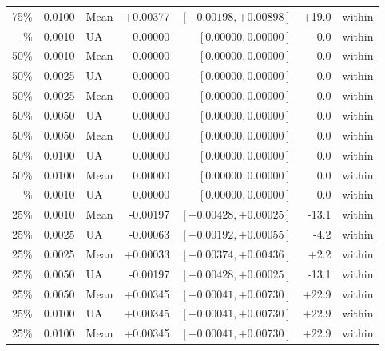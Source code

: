 \begin{table}[H]
\begin{tabular}{@{}rrlrrrl@{}}
75\% & 0.0100 & Mean & +0.00377 & $[-0.00198, +0.00898]$ & +19.0 & within \\
\addlinespace
50\% & 0.0010 & UA & 0.00000 & $[0.00000, 0.00000]$ & 0.0 & within \\
50\% & 0.0010 & Mean & 0.00000 & $[0.00000, 0.00000]$ & 0.0 & within \\
50\% & 0.0025 & UA & 0.00000 & $[0.00000, 0.00000]$ & 0.0 & within \\
50\% & 0.0025 & Mean & 0.00000 & $[0.00000, 0.00000]$ & 0.0 & within \\
50\% & 0.0050 & UA & 0.00000 & $[0.00000, 0.00000]$ & 0.0 & within \\
50\% & 0.0050 & Mean & 0.00000 & $[0.00000, 0.00000]$ & 0.0 & within \\
50\% & 0.0100 & UA & 0.00000 & $[0.00000, 0.00000]$ & 0.0 & within \\
50\% & 0.0100 & Mean & 0.00000 & $[0.00000, 0.00000]$ & 0.0 & within \\
\addlinespace
25\% & 0.0010 & UA & 0.00000 & $[0.00000, 0.00000]$ & 0.0 & within \\
25\% & 0.0010 & Mean & -0.00197 & $[-0.00428, +0.00025]$ & -13.1 & within \\
25\% & 0.0025 & UA & -0.00063 & $[-0.00192, +0.00055]$ & -4.2 & within \\
25\% & 0.0025 & Mean & +0.00033 & $[-0.00374, +0.00436]$ & +2.2 & within \\
25\% & 0.0050 & UA & -0.00197 & $[-0.00428, +0.00025]$ & -13.1 & within \\
25\% & 0.0050 & Mean & +0.00345 & $[-0.00041, +0.00730]$ & +22.9 & within \\
25\% & 0.0100 & UA & +0.00345 & $[-0.00041, +0.00730]$ & +22.9 & within \\
25\% & 0.0100 & Mean & +0.00345 & $[-0.00041, +0.00730]$ & +22.9 & within \\
\bottomrule
\end{tabular}
\end{table}
